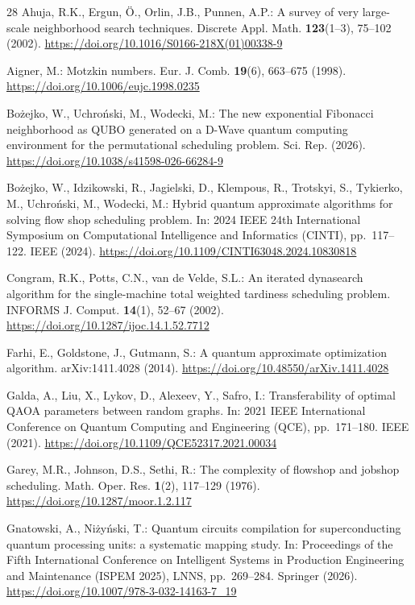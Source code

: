 \documentclass[runningheads]{llncs}
\begin{document}
\begin{thebibliography}{28}
Ahuja, R.K., Ergun, \"{O}., Orlin, J.B., Punnen, A.P.: A survey of very
large-scale neighborhood search techniques. Discrete Appl. Math.
\textbf{123}(1--3), 75--102 (2002).
\url{https://doi.org/10.1016/S0166-218X(01)00338-9}

Aigner, M.: Motzkin numbers. Eur. J. Comb. \textbf{19}(6), 663--675 (1998).
\url{https://doi.org/10.1006/eujc.1998.0235}

Bo\.{z}ejko, W., Uchro\'{n}ski, M., Wodecki, M.: The new exponential Fibonacci
neighborhood as QUBO generated on a D-Wave quantum computing environment for the
permutational scheduling problem. Sci. Rep. (2026).
\url{https://doi.org/10.1038/s41598-026-66284-9}

Bo\.{z}ejko, W., Idzikowski, R., Jagielski, D., Klempous, R., Trotskyi, S.,
Tykierko, M., Uchro\'{n}ski, M., Wodecki, M.: Hybrid quantum approximate
algorithms for solving flow shop scheduling problem. In: 2024 IEEE 24th
International Symposium on Computational Intelligence and Informatics (CINTI),
pp.\ 117--122. IEEE (2024).
\url{https://doi.org/10.1109/CINTI63048.2024.10830818}

Congram, R.K., Potts, C.N., van de Velde, S.L.: An iterated dynasearch
algorithm for the single-machine total weighted tardiness scheduling
problem. INFORMS J. Comput. \textbf{14}(1), 52--67 (2002).
\url{https://doi.org/10.1287/ijoc.14.1.52.7712}

Farhi, E., Goldstone, J., Gutmann, S.: A quantum approximate
optimization algorithm. arXiv:1411.4028 (2014).
\url{https://doi.org/10.48550/arXiv.1411.4028}

Galda, A., Liu, X., Lykov, D., Alexeev, Y., Safro, I.: Transferability of
optimal QAOA parameters between random graphs. In: 2021 IEEE
International Conference on Quantum Computing and Engineering (QCE),
pp.\ 171--180. IEEE (2021).
\url{https://doi.org/10.1109/QCE52317.2021.00034}

Garey, M.R., Johnson, D.S., Sethi, R.: The complexity of flowshop and
jobshop scheduling. Math. Oper. Res. \textbf{1}(2), 117--129 (1976).
\url{https://doi.org/10.1287/moor.1.2.117}

Gnatowski, A., Ni\.{z}y\'{n}ski, T.: Quantum circuits compilation for
superconducting quantum processing units: a systematic mapping study. In:
Proceedings of the Fifth International Conference on Intelligent Systems in
Production Engineering and Maintenance (ISPEM 2025), LNNS, pp.\ 269--284.
Springer (2026). \url{https://doi.org/10.1007/978-3-032-14163-7_19}


\end{thebibliography}
\end{document}
